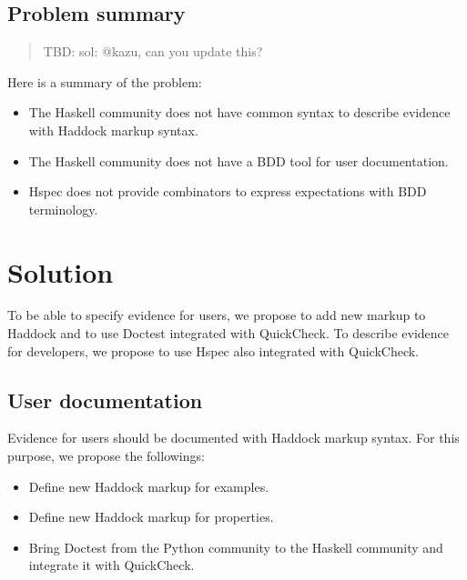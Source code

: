 \documentclass[preprint]{sigplanconf}
\begin{document}
\subsection{Problem summary}


\begin{quote}
    TBD: sol: @kazu, can you update this?
\end{quote}

Here is a summary of the problem:

\begin{itemize}
\item
    The Haskell community does not have common syntax to describe
    evidence with Haddock markup syntax.
\item
    The Haskell community does not have a BDD tool for user documentation.
\item
    Hspec does not provide combinators to express expectations with
    BDD terminology.
\end{itemize}

\section{Solution}

To be able to specify evidence for users, we propose to add new
markup to Haddock and to use Doctest integrated with QuickCheck. To
describe evidence for developers, we propose to use Hspec also
integrated with QuickCheck.

\subsection{User documentation}
\label{sec:user-doc}



Evidence for users should be documented with Haddock markup syntax.
For this purpose, we propose the followings:

\begin{itemize}
\item Define new Haddock markup for examples.
\item Define new Haddock markup for properties.
\item Bring Doctest from the Python community to the Haskell
community and integrate it with QuickCheck.
\end{itemize}

\end{document}

